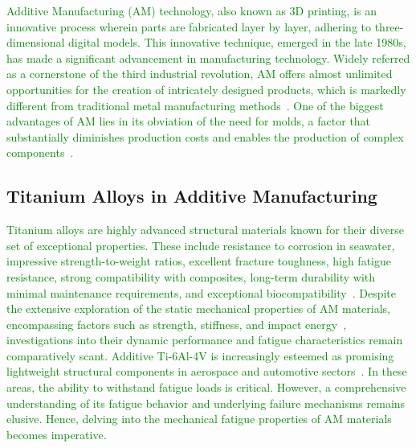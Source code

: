 \documentclass[preprint,12pt]{elsarticle}
\begin{document}
\textcolor{green}{
Additive Manufacturing (AM) technology, also known as 3D printing, is an innovative process wherein parts are fabricated layer by layer, adhering to three-dimensional digital models. This innovative technique, emerged in the late 1980s, has made a significant advancement in manufacturing technology. Widely referred as a cornerstone of the third industrial revolution, AM offers almost unlimited opportunities for the creation of intricately designed products, which is markedly different from traditional metal manufacturing methods~\cite{wong2012review}. One of the biggest advantages of AM lies in its obviation of the need for molds, a factor that substantially diminishes production costs and enables the production of complex components~\cite{herzog2016additive}.}

\subsection{Titanium Alloys in Additive Manufacturing}

\textcolor{green}{
Titanium alloys are highly advanced structural materials known for their diverse set of exceptional properties. These include resistance to corrosion in seawater, impressive strength-to-weight ratios, excellent fracture toughness, high fatigue resistance, strong compatibility with composites, long-term durability with minimal maintenance requirements, and exceptional biocompatibility~\cite{qian2016additive}. Despite the extensive exploration of the static mechanical properties of AM materials, encompassing factors such as strength, stiffness, and impact energy~\cite{debroy2018additive,gorsse2017additive}, investigations into their dynamic performance and fatigue characteristics remain comparatively scant. Additive Ti-6Al-4V is increasingly esteemed as promising lightweight structural components in aerospace and automotive sectors~\cite{boyer1996overview,debroy2018additive}. In these areas, the ability to withstand fatigue loads is critical. However, a comprehensive understanding of its fatigue behavior and underlying failure mechanisms remains elusive. Hence, delving into the mechanical fatigue properties of AM materials becomes imperative.}
\end{document}
